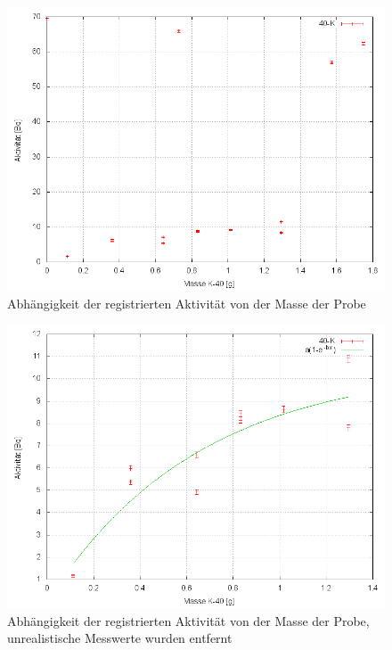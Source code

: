 \begin{figure}
 \centering \includegraphics[width = 0.99\linewidth]{Messwerte/plots/K40_massenabh.png}
 \caption{Abhängigkeit der registrierten Aktivität von der Masse der Probe}
\end{figure}

\begin{figure}
 \centering \includegraphics[width = 0.99\linewidth]{Messwerte/plots/K40_massenabh_bereinigt.png}
 \caption{Abhängigkeit der registrierten Aktivität von der Masse der Probe, unrealistische Messwerte wurden entfernt}
\end{figure}

